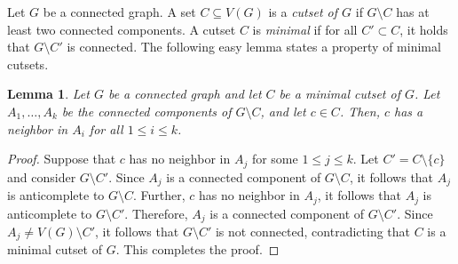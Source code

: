\documentclass[12pt]{amsart}
\newtheorem{lemma}{Lemma}
\begin{document}
Let $G$ be a connected graph. A set $C \subseteq V(G)$ is a {\em cutset of $G$} if $G \setminus C$ has at least two connected components. A cutset $C$ is {\em minimal} if for all $C' \subset C$, it holds that $G \setminus C'$ is connected. The following easy lemma states a property of minimal cutsets.

\begin{lemma}
Let $G$ be a connected graph and let $C$ be a minimal cutset of $G$. Let $A_1, \hdots, A_k$ be the connected components of $G \setminus C$, and let $c \in C$. Then, $c$ has a neighbor in $A_i$ for all $1 \leq i \leq k$. 
\end{lemma}
\begin{proof}
Suppose that $c$ has no neighbor in $A_j$ for some $1 \leq j \leq k$. Let $C' = C \setminus \{c\}$ and consider $G \setminus C'$.  Since $A_j$ is a connected component of $G \setminus C$, it follows that $A_j$ is anticomplete to $G \setminus C$. Further, $c$ has no neighbor in $A_j$, it follows that $A_j$ is anticomplete to $G \setminus C'$. Therefore, $A_j$ is a connected component of $G \setminus C'$. Since $A_j \neq V(G) \setminus C'$, it follows that $G \setminus C'$ is not connected, contradicting that $C$ is a minimal cutset of $G$. This completes the proof.
\end{proof}
\end{document}
